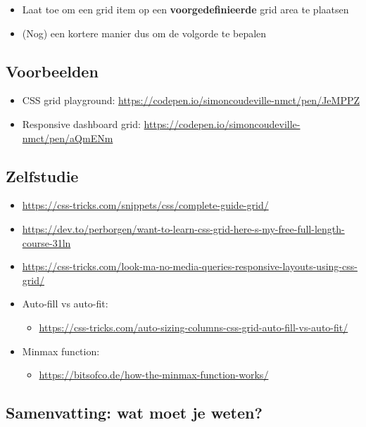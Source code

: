 \documentclass{article}
\newcommand{\bold}[1]{\textbf{#1}}
\begin{document}
\begin{itemize}
    \item Laat toe om een grid item op een \bold{voorgedefinieerde} grid area te plaatsen
    \item (Nog) een kortere manier dus om de volgorde te bepalen
\end{itemize}

\subsection{Voorbeelden}

\begin{itemize}
    \item CSS grid playground: \url{https://codepen.io/simoncoudeville-nmct/pen/JeMPPZ}
    \item Responsive dashboard grid: \url{https://codepen.io/simoncoudeville-nmct/pen/aQmENm}
\end{itemize}

\subsection{Zelfstudie}

\begin{itemize}
    \item \url{https://css-tricks.com/snippets/css/complete-guide-grid/}
    \item \url{https://dev.to/perborgen/want-to-learn-css-grid-here-s-my-free-full-length-course-31ln}
    \item \url{https://css-tricks.com/look-ma-no-media-queries-responsive-layouts-using-css-grid/}
    \item Auto-fill vs auto-fit: 
    \begin{itemize}
        \item \url{https://css-tricks.com/auto-sizing-columns-css-grid-auto-fill-vs-auto-fit/}
    \end{itemize}
    \item Minmax function:
    \begin{itemize}
        \item \url{https://bitsofco.de/how-the-minmax-function-works/}
    \end{itemize}
\end{itemize}

\subsection{Samenvatting: wat moet je weten?}
\end{document}
